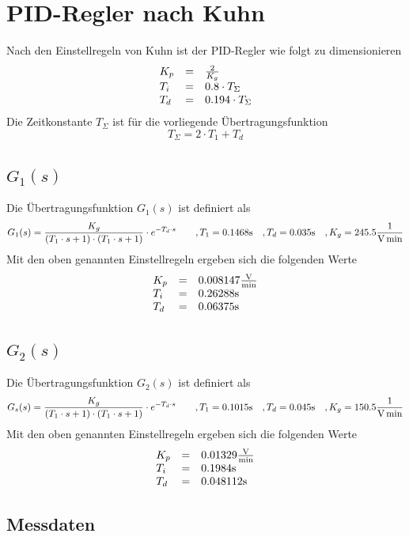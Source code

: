\section{PID-Regler nach Kuhn}
Nach den Einstellregeln von Kuhn ist der PID-Regler wie folgt zu dimensionieren
\[
	\begin{array}{l c l}
		K_p & = & \frac{2}{K_g} \\
		T_i & = & 0.8 \cdot T_\Sigma \\
		T_d & = & 0.194 \cdot T_\Sigma
	\end{array}
\]
Die Zeitkonstante $T_\Sigma$ ist für die vorliegende Übertragungsfunktion
\[
	T_\Sigma = 2 \cdot T_1 + T_d
\]


\subsection{$G_1(s)$}
Die Übertragungsfunktion $G_1(s)$ ist definiert als
\[
	G_1(s)
	= \frac{K_g}{(T_1 \cdot s + 1)
		\cdot (T_1 \cdot s + 1)}
		\cdot e^{-T_d \cdot s}
	\qquad ,T_1 = 0.1468 \si{\second}
	\quad ,T_d = 0.035 \si{\second}
	\quad ,K_g = 245.5 \si[per-mode=fraction]{\per\volt\per\minute}
\]
Mit den oben genannten Einstellregeln ergeben sich die folgenden Werte
\[
	\begin{array}{l c l}
		K_p & = & 0.008147 \si[per-mode=fraction]{\volt\per\minute} \\
		T_i & = & 0.26288 \si{\second} \\
		T_d & = & 0.06375 \si{\second} 
	\end{array}
\]

\subsection{$G_2(s)$}
Die Übertragungsfunktion $G_2(s)$ ist definiert als
\[
	G_s(s)
	= \frac{K_g}{(T_1 \cdot s + 1)
		\cdot (T_1 \cdot s + 1)}
		\cdot e^{-T_d \cdot s}
	\qquad ,T_1 = 0.1015 \si{\second}
	\quad ,T_d = 0.045 \si{\second}
	\quad ,K_g = 150.5 \si[per-mode=fraction]{\per\volt\per\minute}
\]
Mit den oben genannten Einstellregeln ergeben sich die folgenden Werte
\[
	\begin{array}{l c l}
		K_p & = & 0.01329 \si[per-mode=fraction]{\volt\per\minute} \\
		T_i & = & 0.1984 \si{\second} \\
		T_d & = & 0.048112 \si{\second} 
	\end{array}
\]

\subsection{Messdaten}

